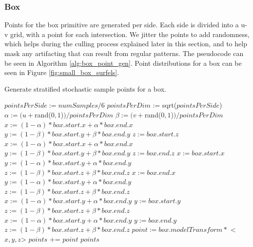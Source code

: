 \subsubsection{Box}
\label{sec:box_point_gen}
Points for the box primitive are generated per side. Each side is divided into a u-v grid, with a point for each intersection. We jitter the points to add randomness, which helps during the culling process explained later in this section, and to help mask any artifacting that can result from regular patterns. The pseudocode can be seen in Algorithm \ref{alg:box_point_gen}. Point distributions for a box can be seen in Figure \ref{fig:small_box_surfels}.

\begin{algorithm}
\captionfont
\caption[Box point generation]{Generate stratified stochastic sample points for a box.}
\label{alg:box_point_gen}
{\fontsize{10}{9}\selectfont
\begin{algorithmic}
      \State $pointsPerSide := numSamples / 6$
      \State $pointsPerDim$ := sqrt($pointsPerSide$)
               \State $\alpha := (u + $rand($0,1$)$) / pointsPerDim$
               \State $\beta := (v + $rand($0,1$)$) / pointsPerDim$
                  \State $x := (1-\alpha) * box.start.x + \alpha * box.end.x$
                  \State $y := (1-\beta) * box.start.y + \beta * box.end.y$
                  \State $z := box.start.z$
                  \State $x := (1-\alpha) * box.start.x + \alpha * box.end.x$
                  \State $y := (1-\beta) * box.start.y + \beta * box.end.y$
                  \State $z := box.end.z$
                  \State $x := box.start.x$
                  \State $y := (1-\alpha) * box.start.y + \alpha * box.end.y$
                  \State $z := (1-\beta) * box.start.z + \beta * box.end.z$
                  \State $x := box.end.x$
                  \State $y := (1-\alpha) * box.start.y + \alpha * box.end.y$
                  \State $z := (1-\beta) * box.start.z + \beta * box.end.z$
                  \State $x := (1-\alpha) * box.start.y + \alpha * box.end.y$
                  \State $y := box.start.y$
                  \State $z := (1-\beta) * box.start.z + \beta * box.end.z$
                  \State $x := (1-\alpha) * box.start.y + \alpha * box.end.y$
                  \State $y := box.end.y$
                  \State $z := (1-\beta) * box.start.z + \beta * box.end.z$
               \EndIf
               \State $point := box.modelTransform *$ \textless$x, y, z$\textgreater
               \State $points$ += $point$
            \EndFor
         \EndFor
      \EndFor
      \State \Return $points$
   \EndFunction
\end{algorithmic}
}
\end{algorithm}

